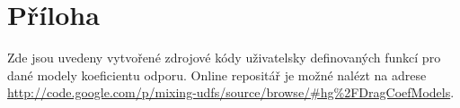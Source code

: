 \chapter*{Příloha}
Zde jsou uvedeny vytvořené zdrojové kódy uživatelsky definovaných funkcí pro dané modely koeficientu odporu. Online repositář je možné nalézt na adrese \href{http://code.google.com/p/mixing-udfs/source/browse/\#hg\%2FDragCoefModels}{http://code.google.com/p/mixing-udfs/source/browse/\#hg\%2FDragCoefModels}. 





